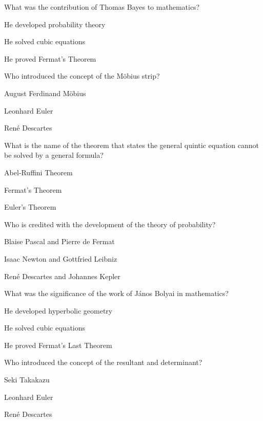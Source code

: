 \begin{enhancedmcq}{What was the contribution of Thomas Bayes to mathematics?}
\item He developed probability theory
\item He solved cubic equations
\item He proved Fermat's Theorem

\end{enhancedmcq}
\begin{enhancedmcq}{Who introduced the concept of the Möbius strip?}
\item August Ferdinand Möbius
\item Leonhard Euler
\item René Descartes

\end{enhancedmcq}
\begin{enhancedmcq}{What is the name of the theorem that states the general quintic equation cannot be solved by a general formula?}
\item Abel‑Ruffini Theorem
\item Fermat's Theorem
\item Euler's Theorem

\end{enhancedmcq}
\begin{enhancedmcq}{Who is credited with the development of the theory of probability?}
\item Blaise Pascal and Pierre de Fermat
\item Isaac Newton and Gottfried Leibniz
\item René Descartes and Johannes Kepler

\end{enhancedmcq}
\begin{enhancedmcq}{What was the significance of the work of János Bolyai in mathematics?}
\item He developed hyperbolic geometry
\item He solved cubic equations
\item He proved Fermat's Last Theorem

\end{enhancedmcq}
\begin{enhancedmcq}{Who introduced the concept of the resultant and determinant?}
\item Seki Takakazu
\item Leonhard Euler
\item René Descartes

\end{enhancedmcq}
